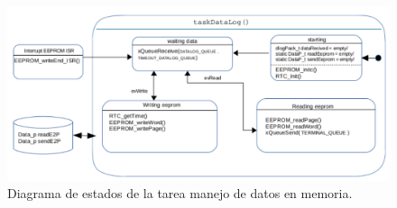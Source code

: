 \begin{figure}[h!]
	\raggedleft
	\includegraphics[width=1.2\textwidth]{Figures/Cap_3/diagrama_tarea_datalog}
	\caption{Diagrama de estados de la tarea manejo de datos en memoria.}
	\label{fig:diag_TareasLogs}
\end{figure}





